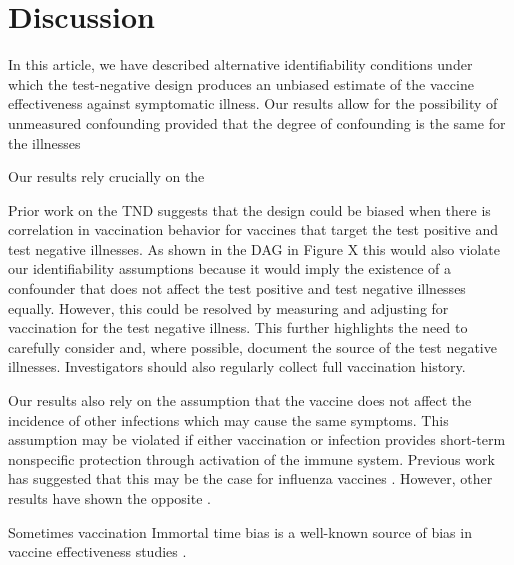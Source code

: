 \documentclass[11pt]{article}
\begin{document}
\section{Discussion} \label{sec:discussion}

In this article, we have described alternative identifiability conditions under which the test-negative design produces an unbiased estimate of the vaccine effectiveness against symptomatic illness. Our results allow for the possibility of unmeasured confounding provided that the degree of confounding is the same for the illnesses 


Our results rely crucially on the

Prior work on the TND suggests that the design could be biased when there is correlation in vaccination behavior for vaccines that target the test positive and test negative illnesses. As shown in the DAG in Figure X this would also violate our identifiability assumptions because it would imply the existence of a confounder that does not affect the test positive and test negative illnesses equally. However, this could be resolved by measuring and adjusting for vaccination for the test negative illness. This further highlights the need to carefully consider and, where possible, document the source of the test negative illnesses. Investigators should also regularly collect full vaccination history.

Our results also rely on the assumption that the vaccine does not affect the incidence of other infections which may cause the same symptoms. This assumption may be violated if either vaccination or infection provides short-term nonspecific protection through activation of the immune system. Previous work has suggested that this may be the case for influenza vaccines \cite{cowling_increased_2012}. However, other results have shown the opposite \cite{sundaram_influenza_2013}.

Sometimes vaccination 
Immortal time bias is a well-known source of bias in vaccine effectiveness studies \cite{suissa_immortal_2008}. 

\newpage
\end{document}
